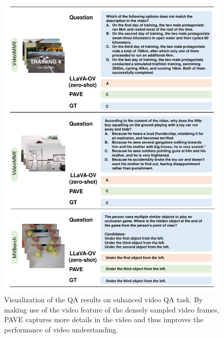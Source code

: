 \begin{figure}[t!]
    \centering
    \includegraphics[width=0.75\linewidth]{figures/additional_general_qa_visualization.pdf}
    \vspace{-1em}
    \caption{Visualization of the QA results on enhanced video QA task. By making use of the video feature of the densely sampled video frames, PAVE captures more details in the video and thus improves the performance of video understanding.}
    \label{fig:enhanced_qa_visualization}
    \vspace{-1.5em}
\end{figure}






